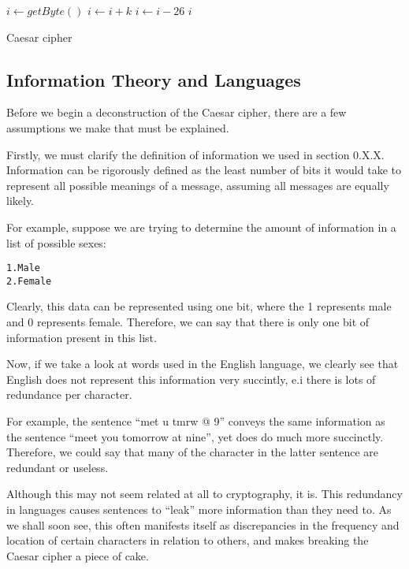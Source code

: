 \documentclass[12pt, a4paper, draft]{report}
\begin{document}
\begin{algorithm}
\begin{algorithmic}
    \State $i\gets getByte()$
    \State $i\gets i + k$
        \State $i\gets i - 26$
    \EndIf
    \State \Return $i$
\end{algorithmic}
\caption{Caesar cipher}
\end{algorithm}

\subsection{Information Theory and Languages}

Before we begin a deconstruction of the Caesar cipher, there are a few
assumptions we make that must be explained.

Firstly, we must clarify the definition of information we used in section
0.X.X. Information can be rigorously defined as the least number of bits
it would take to represent all possible meanings of a message, assuming
all messages are equally likely.

For example, suppose we are trying to determine the amount of information
in a list of possible sexes:

\begin{center}
\begin{alltt}
1. Male
2. Female
\end{alltt}
\end{center}

Clearly, this data can be represented using one bit, where the 1
represents male and 0 represents female. Therefore, we can say that there
is only one bit of information present in this list.

Now, if we take a look at words used in the English language, we clearly
see that English does not represent this information very succintly, e.i
there is lots of redundance per character.

For example, the sentence ``met u tmrw @ 9'' conveys the same information
as the sentence ``meet you tomorrow at nine'', yet does do much more
succinctly. Therefore, we could say that many of the character in the
latter sentence are redundant or useless.

Although this may not seem related at all to cryptography, it is. This
redundancy in languages causes sentences to ``leak'' more information than
they need to. As we shall soon see, this often manifests itself as
discrepancies in the frequency and location of certain characters in
relation to others, and makes breaking the Caesar cipher a piece of
cake.
\end{document}
